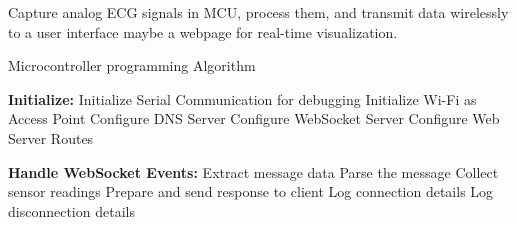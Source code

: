 Capture analog ECG signals in MCU, process them, and transmit data wirelessly to a user interface maybe a webpage for real-time visualization\cite{Wang2017}.
\begin{algorithm}
\caption{Microcontroller programming Algorithm}
\begin{algorithmic}[1]
\STATE \textbf{Initialize:}
\STATE Initialize Serial Communication for debugging
\STATE Initialize Wi-Fi as Access Point
\STATE Configure DNS Server
\STATE Configure WebSocket Server
\STATE Configure Web Server Routes

    \STATE \textbf{Handle WebSocket Events:}
        \STATE Extract message data
        \STATE Parse the message
        \STATE Collect sensor readings
        \STATE Prepare and send response to client
    \ENDIF
        \STATE Log connection details
    \ENDIF
        \STATE Log disconnection details
    \ENDIF
\ENDWHILE
\end{algorithmic}
\end{algorithm}

